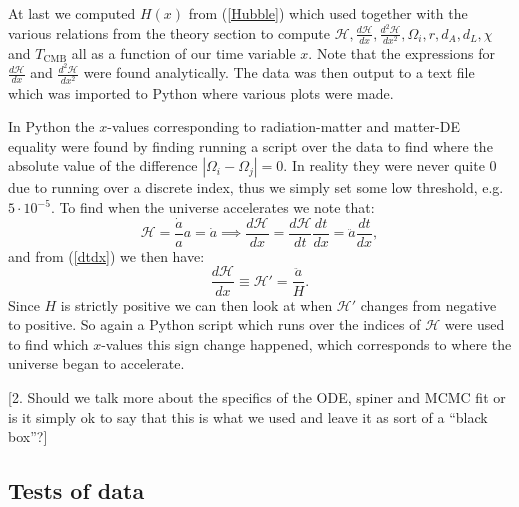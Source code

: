 \documentclass[%
reprint,
 amsmath,amssymb,
 aps,
]{revtex4-2}
\newcommand{\Hp}{\mathcal{H}}
\begin{document}
At last we computed $H(x)$ from (\ref{Hubble}) which used together with the various relations from the theory section to compute $\Hp,\frac{d\Hp}{dx},\frac{d^2\Hp}{dx^2},\Omega_i,r,d_A,d_L,\chi$ and $T_{\text{CMB}}$ all as a function of our time variable $x$. Note that the expressions for $\frac{d\Hp}{dx}$ and $\frac{d^2\Hp}{dx^2}$ were found analytically. The data was then output to a text file which was imported to Python where various plots were made.

In Python the $x$-values corresponding to radiation-matter and matter-DE equality were found by finding running a script over the data to find where the absolute value of the difference $|\Omega_i-\Omega_j|=0$. In reality they were never quite 0 due to running over a discrete index, thus we simply set some low threshold, e.g. $5\cdot10^{-5}$. To find when the universe accelerates we note that:
\[\Hp=\frac{\dot a}{a}a=\dot a\implies \frac{d\Hp}{dx}=\frac{d\Hp}{dt}\frac{dt}{dx}=\ddot{a}\frac{dt}{dx},\]
and from (\ref{dtdx}) we then have:
\[\frac{d\Hp}{dx}\equiv\Hp'=\frac{\ddot a}{H}.\]
Since $H$ is strictly positive we can then look at when $\Hp'$ changes from negative to positive. So again a Python script which runs over the indices of $\Hp$ were used to find which $x$-values this sign change happened, which corresponds to where the universe began to accelerate. 

\color{red}[2. Should we talk more about the specifics of the ODE, spiner and MCMC fit or is it simply ok to say that this is what we used and leave it as sort of a ``black box''?]\color{black}

\subsection{Tests of data}
\end{document}
